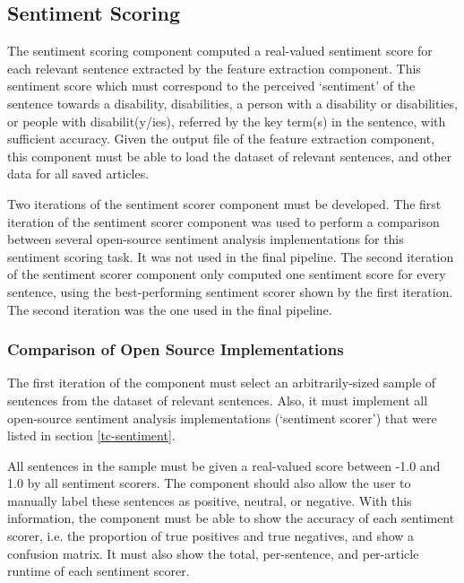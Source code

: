 \documentclass{report}
\begin{document}
\subsection{Sentiment Scoring} \label{req-sentiment}

The sentiment scoring component computed a real-valued sentiment score for each relevant sentence extracted by the feature extraction component.
This sentiment score which must correspond to the perceived `sentiment' of the sentence towards a disability, disabilities, a person with a disability or disabilities, or people with disabilit(y/ies), referred by the key term(s) in the sentence, with sufficient accuracy.
Given the output file of the feature extraction component, this component must be able to load the dataset of relevant sentences, and other data for all saved articles.

Two iterations of the sentiment scorer component must be developed.
The first iteration of the sentiment scorer component was used to perform a comparison between several open-source sentiment analysis implementations for this sentiment scoring task.
It was not used in the final pipeline.
The second iteration of the sentiment scorer component only computed one sentiment score for every sentence, using the best-performing sentiment scorer shown by the first iteration.
The second iteration was the one used in the final pipeline.

\subsubsection{Comparison of Open Source Implementations} \label{req-sentiment-comparison}

The first iteration of the component must select an arbitrarily-sized sample of sentences from the dataset of relevant sentences.
Also, it must implement all open-source sentiment analysis implementations (`sentiment scorer') that were listed in section \ref{tc-sentiment}.

All sentences in the sample must be given a real-valued score between -1.0 and 1.0 by all sentiment scorers. 
The component should also allow the user to manually label these sentences as positive, neutral, or negative.
With this information, the component must be able to show the accuracy of each sentiment scorer, i.e. the proportion of true positives and true negatives, and show a confusion matrix.
It must also show the total, per-sentence, and per-article runtime of each sentiment scorer.
\end{document}
